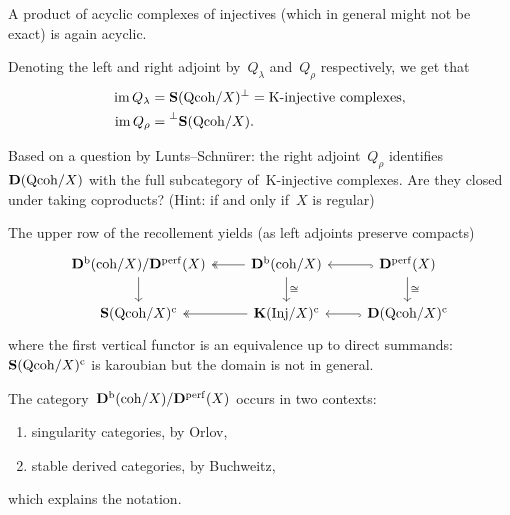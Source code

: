 \documentclass[10pt,a4paper]{article}
\begin{document}
\begin{corollary}
  A product of acyclic complexes of injectives (which in general might not be exact) is again acyclic.
\end{corollary}

\begin{remark}
  Denoting the left and right adjoint by~$Q_\lambda$ and~$Q_\rho$ respectively, we get that
  \begin{equation}
    \begin{aligned}
      \operatorname{im} Q_\lambda&=\operatorname{\mathbf{S}}(\mathrm{Qcoh}/X)^\perp=\text{K-injective complexes}, \\
      \operatorname{im} Q_\rho&=\prescript{\perp}{}{\operatorname{\mathbf{S}}(\ensuremath{\mathrm{Qcoh}}/X)}.
    \end{aligned}
  \end{equation}
\end{remark}

\begin{exercise}
  Based on a question by Lunts--Schn\"urer: the right adjoint~$Q_\rho$ identifies~$\mathbf{D}(\mathrm{Qcoh}/X)$ with the full subcategory of~K-injective complexes. Are they closed under taking coproducts? (Hint: if and only if~$X$ is regular)
\end{exercise}

\begin{corollary}
  The upper row of the recollement yields (as left adjoints preserve compacts)
  \begin{equation}
    \begin{tikzcd}
      \derived^\bounded(\coh/X)/\derived^\perf(X) \arrow{d} & \derived^\bounded(\coh/X) \arrow{d}{\cong} \arrow[two heads]{l} & \derived^\perf(X) \arrow{d}{\cong} \arrow[hook]{l} \\
      \SSing(\Qcoh/X)^\cc & \KKK(\Inj/X)^\cc \arrow[two heads]{l} & \derived(\Qcoh/X)^\cc \arrow[hook]{l}
    \end{tikzcd}
  \end{equation}
  where the first vertical functor is an equivalence up to direct summands: $\operatorname{\mathbf{S}}(\mathrm{Qcoh}/X)^{\mathrm{c}}$ is karoubian but the domain is not in general.
\end{corollary}
The category~$\mathbf{D}^{\mathrm{b}}(\mathrm{coh}/X)/\mathbf{D}^{\mathrm{perf}}(X)$ occurs in two contexts:
\begin{enumerate}
  \item singularity categories, by Orlov,
  \item stable derived categories, by Buchweitz,
\end{enumerate}
which explains the notation.
\end{document}
